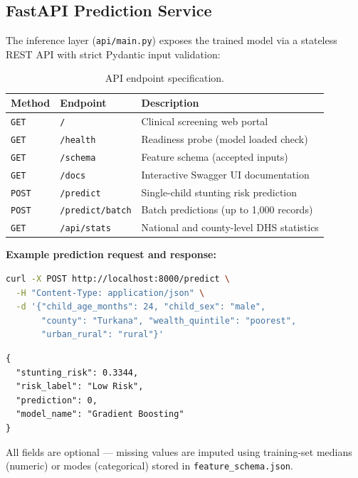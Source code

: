 \documentclass[12pt, a4paper]{article}
\begin{document}
\subsection{FastAPI Prediction Service}

The inference layer (\texttt{api/main.py}) exposes the trained model via a stateless REST API with strict Pydantic input validation:

\begin{table}[H]
\centering
\caption{API endpoint specification.}
\label{tab:api}
\begin{tabular}{llp{7.5cm}}
\toprule
\textbf{Method} & \textbf{Endpoint} & \textbf{Description} \\
\midrule
\texttt{GET}  & \texttt{/}             & Clinical screening web portal \\
\texttt{GET}  & \texttt{/health}       & Readiness probe (model loaded check) \\
\texttt{GET}  & \texttt{/schema}       & Feature schema (accepted inputs) \\
\texttt{GET}  & \texttt{/docs}         & Interactive Swagger UI documentation \\
\texttt{POST} & \texttt{/predict}      & Single-child stunting risk prediction \\
\texttt{POST} & \texttt{/predict/batch} & Batch predictions (up to 1,000 records) \\
\texttt{GET}  & \texttt{/api/stats}    & National and county-level DHS statistics \\
\bottomrule
\end{tabular}
\end{table}

\textbf{Example prediction request and response:}

\begin{lstlisting}[language=bash]
curl -X POST http://localhost:8000/predict \
  -H "Content-Type: application/json" \
  -d '{"child_age_months": 24, "child_sex": "male",
       "county": "Turkana", "wealth_quintile": "poorest",
       "urban_rural": "rural"}'
\end{lstlisting}

\begin{lstlisting}
{
  "stunting_risk": 0.3344,
  "risk_label": "Low Risk",
  "prediction": 0,
  "model_name": "Gradient Boosting"
}
\end{lstlisting}

All fields are optional — missing values are imputed using training-set medians (numeric) or modes (categorical) stored in \texttt{feature\_schema.json}.
\end{document}
